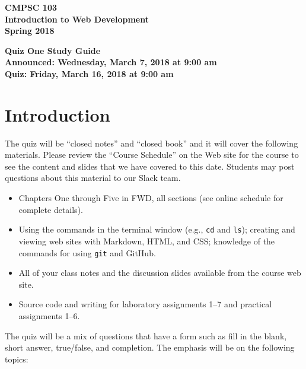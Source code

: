 \documentclass[11pt]{article}
\newcommand{\assignmentduedate}{March 16}
\newcommand{\assignmentassignedate}{March 7}
\newcommand{\assignmentnumber}{One}
\newcommand{\labyear}{2018}
\newcommand{\assignedday}{Wednesday}
\newcommand{\dueday}{Friday}
\newcommand{\labtime}{9:00 am}
\newcommand{\assigneddate}{Announced: \assignedday, \assignmentassignedate, \labyear{} at \labtime{}}
\newcommand{\duedate}{Quiz: \dueday, \assignmentduedate, \labyear{} at \labtime{}}
\newcommand{\program}[1]{\lstinline{#1}}
\newcommand{\guidetitle}[1]
{
  \begin{center}
    \begin{center}
      \bf
      CMPSC 103\\Introduction to Web Development\\
      Spring 2018\\
      \medskip
    \end{center}
    \bf
    #1
  \end{center}
}
\begin{document}
\thispagestyle{empty}

\guidetitle{Quiz \assignmentnumber{} Study Guide \\ \assigneddate{} \\ \duedate{}}

\section*{Introduction}

\noindent
The quiz will be ``closed notes'' and ``closed book'' and it will cover the
following materials. Please review the ``Course Schedule'' on the Web site for
the course to see the content and slides that we have covered to this date.
Students may post questions about this material to our Slack team.

\begin{itemize}

  \itemsep 0in

  \item Chapters One through Five in FWD, all sections (see online schedule for
    complete details).

  \item Using the commands in the terminal window (e.g., \program{cd} and
    \program{ls}); creating and viewing web sites with Markdown, HTML, and CSS;
    knowledge of the commands for using \program{git} and GitHub.

  \item All of your class notes and the discussion slides available from the
    course web site.

  \item Source code and writing for laboratory assignments 1--7 and practical
    assignments 1--6.

\end{itemize}

\noindent The quiz will be a mix of questions that have a form such as fill in
the blank, short answer, true/false, and completion. The emphasis will be on the
following topics:
\end{document}
